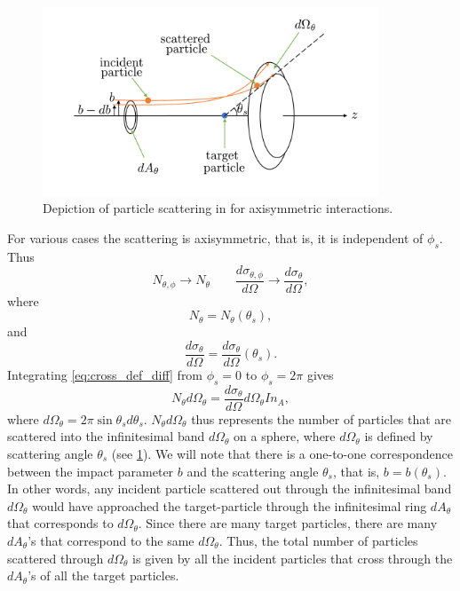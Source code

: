 \documentclass[a4paper,11pt]{report}
\begin{document}
\begin{figure}[ht]
    \centering
    \includegraphics[width=10cm]{../../images/scattering_axi.pdf}
    \caption{Depiction of particle scattering in for axisymmetric interactions.}
    \label{fig:scattering_axi}
\end{figure}
For various cases the scattering is axisymmetric, that is, it is independent of $\phi_s$. Thus
\begin{equation*}
    N_{\theta, \phi} \to N_\theta \qquad \frac{d\sigma_{\theta,\phi}}{d\Omega} \to \frac{d\sigma_\theta}{d\Omega},
\end{equation*}
where 
\begin{equation*}
    N_\theta = N_\theta (\theta_s),
\end{equation*}
and
\begin{equation*}
    \frac{d\sigma_\theta}{d\Omega} = \frac{d\sigma_\theta}{d\Omega} (\theta_s).
\end{equation*}
Integrating \cref{eq:cross_def_diff} from $\phi_s = 0$ to $\phi_s = 2\pi$ gives
\begin{equation}
    \label{eq:cross_def_diff_axi}
    N_\theta d\Omega_\theta = \frac{d\sigma_\theta}{d\Omega} d\Omega_\theta I n_A,
\end{equation}
where $d \Omega_\theta = 2\pi \sin \theta_s d\theta_s$. $N_\theta d\Omega_\theta$ thus represents the number of particles that are scattered into the infinitesimal band $d\Omega_\theta$ on a sphere, where $d\Omega_\theta$ is defined by scattering angle $\theta_s$ (see \cref{fig:scattering_axi}). We will note that there is a one-to-one correspondence between the impact parameter $b$ and the scattering angle $\theta_s$, that is, $b = b(\theta_s)$. In other words, any incident particle scattered out through the infinitesimal band $d\Omega_\theta$ would have approached the target-particle through the infinitesimal ring $dA_\theta$ that corresponds to $d\Omega_\theta$. Since there are many target particles, there are many $dA_\theta$'s that correspond to the same $d\Omega_\theta$. Thus, the total number of particles scattered through $d\Omega_\theta$ is given by all the incident particles that cross through the $dA_\theta$'s of all the target particles.
\end{document}
